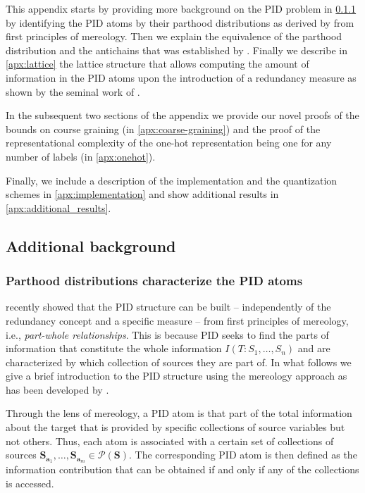 \documentclass[10pt]{article}
\renewcommand\autoref[1]{\cref{#1}}
\theoremstyle{definition}
\theoremstyle{plain}
\begin{document}
This appendix starts by providing more background on the PID problem in \autoref{apx:parthood_distributions_pid_atoms} by identifying the PID atoms by their parthood distributions as derived by \cite{gutknecht_bits_2021} from first principles of mereology. Then we explain the equivalence of the parthood distribution and the antichains that was established by \cite{gutknecht_bits_2021}. Finally we describe in \autoref{apx:lattice} the lattice structure that allows computing the amount of information in the PID atoms upon the introduction of a redundancy measure as shown by the seminal work of \cite{williams_nonnegative_2010}.

In the subsequent two sections of the appendix we provide our novel proofs of the bounds on course graining (in \autoref{apx:coarse-graining}) and the proof of the representational complexity of the one-hot representation being one for any number of labels (in \autoref{apx:onehot}).

Finally, we include a description of the implementation and the quantization schemes in \autoref{apx:implementation} and show additional results in \autoref{apx:additional_results}. 
 

\subsection{Additional background}

\subsubsection{Parthood distributions characterize the PID atoms}
\label{apx:parthood_distributions_pid_atoms}
\cite{gutknecht_bits_2021} recently showed that the PID structure can be built -- independently of the redundancy concept and a specific measure -- from first principles of mereology, i.e., \emph{part-whole relationships}. This is because PID seeks to find the parts of information that constitute the whole information $I(T: S_1,\ldots, S_n)$ and are characterized by which collection of sources they are part of. In what follows we give a brief introduction to the PID structure using the mereology approach as has been developed by \cite[Section 2]{gutknecht_bits_2021}.

Through the lens of mereology, a PID atom is that part of the total information about the target that is provided by specific collections of source variables but not others. Thus, each atom is associated with a certain set of collections of sources $\bm S_{\mathbf{a}_1},\ldots, \bm S_{\mathbf{a}_m}\in\mathcal P(\bm S)$. The corresponding PID atom is then defined as the information contribution that can be obtained if and only if any of the collections is accessed.
\end{document}
